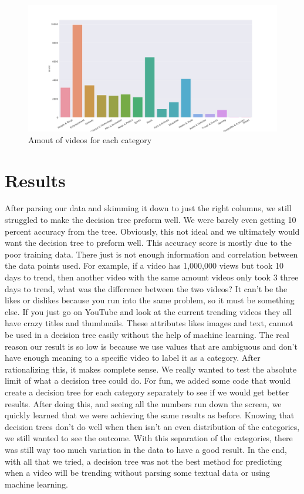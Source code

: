 \documentclass{article}
\begin{document}
\begin{figure}[!h]
    \centering
    \includegraphics[width=1\textwidth]{category_graph.png}
    \caption{Amout of videos for each category}
    \label{fig:iris}
\end{figure}

\section*{Results}
\par
    After parsing our data and skimming it down to just the right columns, we still struggled to make the decision tree preform well.
We were barely even getting 10 percent accuracy from the tree.
Obviously, this not ideal and we ultimately would want the decision tree to preform well. 
This accuracy score is mostly due to the poor training data.
There just is not enough information and correlation between the data points used.
For example, if a video has 1,000,000 views but took 10 days to trend, then another video with the same amount videos only took 3 three days to trend, what was the difference between the two videos?
It can't be the likes or dislikes because you run into the same problem, so it must be something else. 
If you just go on YouTube and look at the current trending videos they all have crazy titles and thumbnails. 
These attributes likes images and text, cannot be used in a decision tree easily without the help of machine learning. 
The real reason our result is so low is because we use values that are ambiguous and don't have enough meaning to a specific video to label it as a category.
After rationalizing this, it makes complete sense.
We really wanted to test the absolute limit of what a decision tree could do.
For fun, we added some code that would create a decision tree for each category separately to see if we would get better results.
After doing this, and seeing all the numbers run down the screen, we quickly learned that we were achieving the same results as before.
Knowing that decision trees don't do well when then isn't an even distribution of the categories, we still wanted to see the outcome.
With this separation of the categories, there was still way too much variation in the data to have a good result. 
In the end, with all that we tried, a decision tree was not the best method for predicting when a video will be trending without parsing some textual data or using machine learning.
\end{document}
